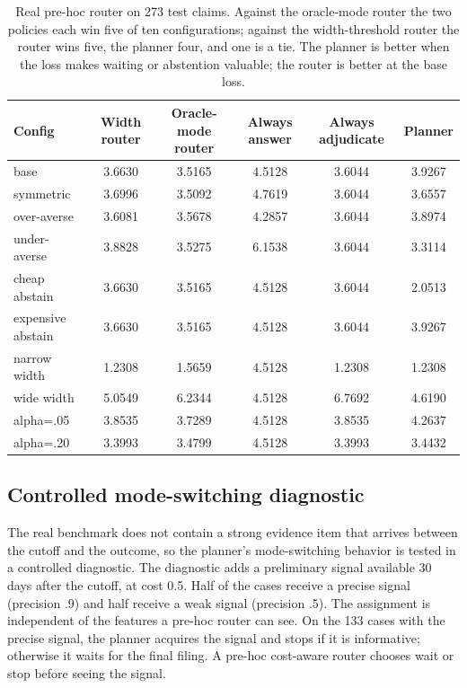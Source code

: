 \documentclass[11pt]{article}
\begin{document}
\begin{table}[t]
\centering
\small
\setlength{\tabcolsep}{4pt}
\begin{tabular}{lccccc}
\toprule
Config & Width router & Oracle-mode router & Always answer & Always adjudicate & Planner \\
\midrule
base & 3.6630 & 3.5165 & 4.5128 & 3.6044 & 3.9267 \\
symmetric & 3.6996 & 3.5092 & 4.7619 & 3.6044 & 3.6557 \\
over-averse & 3.6081 & 3.5678 & 4.2857 & 3.6044 & 3.8974 \\
under-averse & 3.8828 & 3.5275 & 6.1538 & 3.6044 & 3.3114 \\
cheap abstain & 3.6630 & 3.5165 & 4.5128 & 3.6044 & 2.0513 \\
expensive abstain & 3.6630 & 3.5165 & 4.5128 & 3.6044 & 3.9267 \\
narrow width & 1.2308 & 1.5659 & 4.5128 & 1.2308 & 1.2308 \\
wide width & 5.0549 & 6.2344 & 4.5128 & 6.7692 & 4.6190 \\
alpha=.05 & 3.8535 & 3.7289 & 4.5128 & 3.8535 & 4.2637 \\
alpha=.20 & 3.3993 & 3.4799 & 4.5128 & 3.3993 & 3.4432 \\
\bottomrule
\end{tabular}
\caption{Real pre-hoc router on 273 test claims. Against the oracle-mode router
the two policies each win five of ten configurations; against the
width-threshold router the router wins five, the planner four, and one is a
tie. The planner is better when the loss makes waiting or abstention valuable;
the router is better at the base loss.}
\label{tab:router}
\end{table}

\subsection{Controlled mode-switching diagnostic}
\label{app:controlled}
The real benchmark does not contain a strong evidence item that arrives between the cutoff and the outcome, so the planner's mode-switching behavior is tested in a controlled diagnostic. The diagnostic adds a preliminary signal available 30 days after the cutoff, at cost 0.5. Half of the cases receive a precise signal (precision .9) and half receive a weak signal (precision .5). The assignment is independent of the features a pre-hoc router can see. On the 133 cases with the precise signal, the planner acquires the signal and stops if it is informative; otherwise it waits for the final filing. A pre-hoc cost-aware router chooses wait or stop before seeing the signal.
\end{document}
